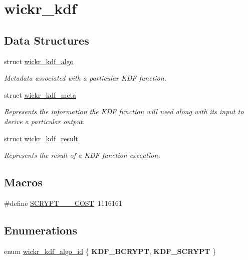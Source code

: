 \hypertarget{group__wickr__kdf}{}\section{wickr\+\_\+kdf}
\label{group__wickr__kdf}
\subsection*{Data Structures}
\begin{DoxyCompactItemize}
\item 
struct \hyperlink{structwickr__kdf__algo}{wickr\+\_\+kdf\+\_\+algo}
\begin{DoxyCompactList}\small\item\em Metadata associated with a particular K\+DF function. \end{DoxyCompactList}\item 
struct \hyperlink{structwickr__kdf__meta}{wickr\+\_\+kdf\+\_\+meta}
\begin{DoxyCompactList}\small\item\em Represents the information the K\+DF function will need along with it\textquotesingle{}s input to derive a particular output. \end{DoxyCompactList}\item 
struct \hyperlink{structwickr__kdf__result}{wickr\+\_\+kdf\+\_\+result}
\begin{DoxyCompactList}\small\item\em Represents the result of a K\+DF function execution. \end{DoxyCompactList}\end{DoxyCompactItemize}
\subsection*{Macros}
\begin{DoxyCompactItemize}
\item 
\#define \hyperlink{group__wickr__kdf_ga5e8df13eb2cd5cc1e09f377675ddc50f}{S\+C\+R\+Y\+P\+T\+\_\+\_\+\_\+\+C\+O\+ST}~1116161
\end{DoxyCompactItemize}
\subsection*{Enumerations}
\begin{DoxyCompactItemize}
\item 
enum \hyperlink{group__wickr__kdf_ga106149e3507106abb6b5be843a4e7c16}{wickr\+\_\+kdf\+\_\+algo\+\_\+id} \{ {\bfseries K\+D\+F\+\_\+\+B\+C\+R\+Y\+PT}, 
{\bfseries K\+D\+F\+\_\+\+S\+C\+R\+Y\+PT}
 \}
\end{DoxyCompactItemize}
